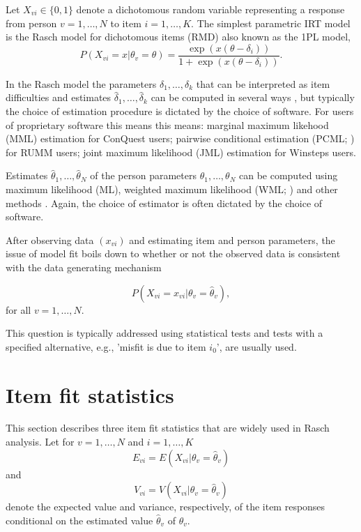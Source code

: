 \documentclass[11pt,a4paper]{article}
\begin{document}
Let $X_{vi} \in \{0,1\}$ denote a dichotomous random variable representing a response from person $v = 1,\ldots, N$ to item $i = 1,\ldots,K$. The simplest parametric IRT model is the Rasch \citeyear{Rasch-1960} model for dichotomous items (RMD) also known as the 1PL model, 
\begin{equation}
\label{RMD}
P(X_{vi}=x|\theta_v=\theta)
=\frac{\exp(x(\theta-\delta_i))}{1 + \exp(x(\theta-\delta_i))}.
\end{equation}

In the Rasch model the parameters $\delta_1,\ldots,\delta_k$ that can be interpreted as item difficulties and estimates $\hat\delta_1,\ldots,\hat\delta_k$ can be computed in several ways \cite{Christensen-2013,Robitzsch-2021}, but typically the choice of estimation procedure is dictated by the choice of software. For users of proprietary software this means this means: marginal maximum likehood (MML) estimation for ConQuest \cite{Adams-Wu-Cloney-Wilson-2020} users; pairwise conditional estimation (PCML; ) for RUMM \cite{Andrich-Sheridan-Luo-2010} users; joint maximum likelihood (JML) estimation for Winsteps \cite{Winsteps} users. 

Estimates $\hat\theta_1,\ldots,\hat\theta_N$ of the person parameters $\theta_1,\ldots,\theta_N$ can be computed using maximum likelihood (ML), weighted maximum likelihood (WML; ) and other methods \cite{Kreiner-Christensen-2013}. Again, the choice of estimator is often dictated by the choice of software.

After observing data $(x_{vi})$ and estimating item and person parameters, the issue of model fit boils down to whether or not the observed data is consistent with the data generating mechanism

\begin{equation}
\label{IRThat}
P(X_{vi}=x_{vi}|\theta_v=\hat\theta_v),
\end{equation}
for all $v = 1,\ldots,N$.

This question is typically addressed using statistical tests and tests with a specified alternative, e.g., 'misfit is due to item $i_0$', are usually used.


\section{Item fit statistics}

This section describes three item fit statistics that are widely used in Rasch analysis. Let for $v=1,\ldots,N$ and $i=1,\ldots,K$
$$
E_{vi} = E(X_{vi} | \theta_v = \hat\theta_v)
$$ 
and 
$$
V_{vi} = V(X_{vi} | \theta_v = \hat\theta_v)
$$
denote the expected value and variance, respectively, of the item responses conditional on the estimated value $\hat\theta_v$ of $\theta_v$.
\end{document}
